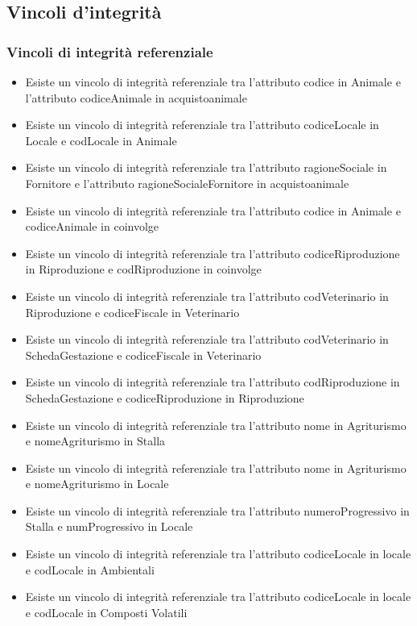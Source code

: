 \documentclass[12pt,a4paper]{article}
\begin{document}
\subsection{Vincoli d'integrità}
  \subsubsection{Vincoli di integrità referenziale}
\begin{itemize}
   \item Esiste un vincolo di integrità referenziale tra l'attributo codice in Animale e l'attributo codiceAnimale in acquistoanimale
   \item Esiste un vincolo di integrità referenziale tra l'attributo codiceLocale in Locale e codLocale in Animale
   \item Esiste un vincolo di integrità referenziale tra l'attributo ragioneSociale in Fornitore e l'attributo ragioneSocialeFornitore in acquistoanimale
   \item Esiste un vincolo di integrità referenziale tra l'attributo codice in Animale e codiceAnimale in coinvolge
   \item Esiste un vincolo di integrità referenziale tra l'attributo codiceRiproduzione in Riproduzione e codRiproduzione in coinvolge
   \item Esiste un vincolo di integrità referenziale tra l'attributo codVeterinario in Riproduzione e codiceFiscale in Veterinario
   \item Esiste un vincolo di integrità referenziale tra l'attributo codVeterinario in SchedaGestazione e codiceFiscale in Veterinario
   \item Esiste un vincolo di integrità referenziale tra l'attributo codRiproduzione in SchedaGestazione e codiceRiproduzione in Riproduzione
   \item Esiste un vincolo di integrità referenziale tra l'attributo nome in Agriturismo e nomeAgriturismo in Stalla
   \item Esiste un vincolo di integrità referenziale tra l'attributo nome in Agriturismo e nomeAgriturismo in Locale
   \item Esiste un vincolo di integrità referenziale tra l'attributo numeroProgressivo in Stalla e numProgressivo in Locale
   \item Esiste un vincolo di integrità referenziale tra l'attributo codiceLocale in locale e codLocale in Ambientali
   \item Esiste un vincolo di integrità referenziale tra l'attributo codiceLocale in locale e codLocale in Composti Volatili

\end{itemize}
\end{document}

